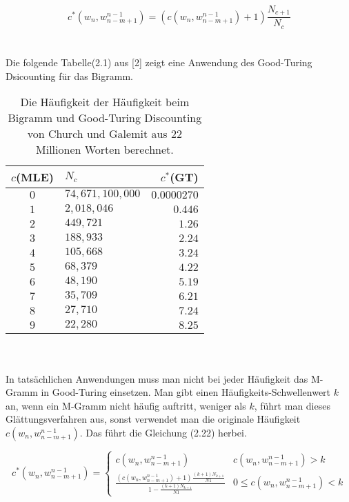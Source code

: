 \begin{equation}
c^{*}(w_{n},w_{n-m+1}^{n-1})=(c(w_{n},w_{n-m+1}^{n-1})+1)\frac{N_{c+1}}{N_{c}}
\end{equation}
\\
\\
Die folgende Tabelle(2.1)  aus [2] zeigt eine Anwendung des Good-Turing Dsicounting f\"ur das Bigramm.
\begin{table}[h]
  \begin{center}
    \begin{tabular}{clr}
      \toprule
      \bf $c$(MLE) & \bf $N_{c}$ & \bf $c^{*}$(GT)\\      
      \midrule
      $0$ &  $74,671,100,000$ & $0.0000270$  \\
      $1$ &  $2,018,046$ 			& $0.446$  \\
      $2$ &  $449,721$ 				& $1.26$  \\
      $3$ &  $188,933$ 				& $2.24$  \\
      $4$ &  $105,668$ 				& $3.24$  \\
      $5$ &  $68,379$ 				& $4.22$  \\
      $6$ &  $48,190$ 				& $5.19$  \\
      $7$ &  $35,709$ 				& $6.21$  \\
      $8$ &  $27,710$ 				& $7.24$  \\
      $9$ &  $22,280$ 				& $8.25$  \\
      \bottomrule
    \end{tabular}
  \end{center}
\caption{Die H\"aufigkeit der H\"aufigkeit beim Bigramm und Good-Turing Discounting von Church und Galemit aus 22 Millionen Worten berechnet.}
\label{tab:table_1}
\end{table}
\\
\\
In tats\"achlichen Anwendungen muss man nicht bei jeder H\"aufigkeit das M-Gramm in Good-Turing einsetzen. Man gibt einen H\"aufigkeits-Schwellenwert $k$ an, wenn ein M-Gramm nicht h\"aufig auftritt, weniger als $k$, f\"uhrt man dieses Gl\"attungsverfahren aus, sonst verwendet man die originale H\"aufigkeit $c(w_{n},w_{n-m+1}^{n-1})$. Das f\"uhrt die Gleichung (2.22) herbei.

\begin{equation}
\label{equationo:witten_bell_04}
c^{*}(w_{n},w_{n-m+1}^{n-1})=\begin{cases}
c(w_{n},w_{n-m+1}^{n-1}) & c(w_{n},w_{n-m+1}^{n-1})>k \\
\frac{(c(w_{n},w_{n-m+1}^{n-1})+1)\frac{(k+1)N_{k+1}}{N{1}}}{1-\frac{(k+1)N_{k+1}}{N{1}}} & 0 \leq c(w_{n},w_{n-m+1}^{n-1})<k 
\end{cases}
\end{equation}